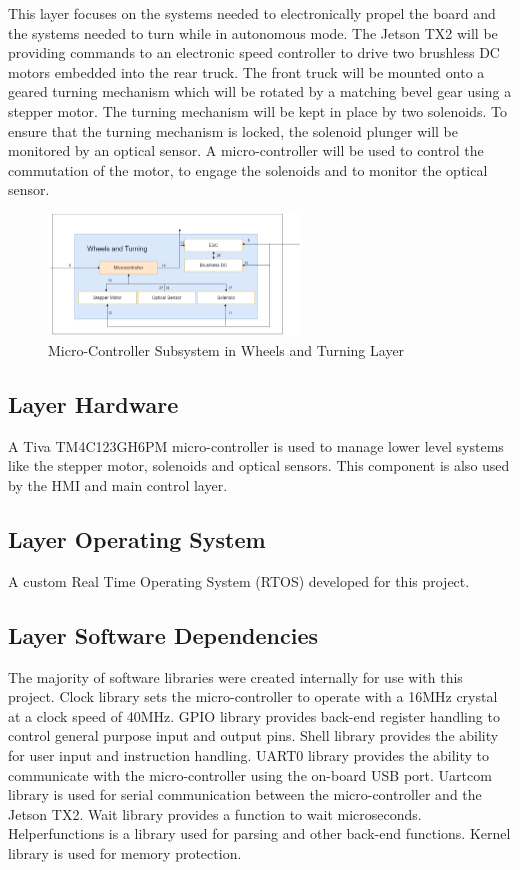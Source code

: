 This layer focuses on the systems needed to electronically propel the board and the systems needed to turn while in autonomous mode. The Jetson TX2 will be providing commands to an electronic speed controller to drive two brushless DC motors embedded into the rear truck. The front truck will be mounted onto a geared turning mechanism which will be rotated by a matching bevel gear using a stepper motor. The turning mechanism will be kept in place by two solenoids. To ensure that the turning mechanism is locked, the solenoid plunger will be monitored by an optical sensor. A micro-controller will be used to control the commutation of the motor, to engage the solenoids and to monitor the optical sensor.

\begin{figure}[h!]
	\centering
 	\includegraphics[width=0.60\textwidth]{images/Keaton/MicroC.png}
 \caption{Micro-Controller Subsystem in Wheels and Turning Layer}
\end{figure}

\subsection{Layer Hardware}
A Tiva TM4C123GH6PM micro-controller is used to manage lower level systems like the stepper motor, solenoids and optical sensors. This component is also used by the HMI and main control layer.

\subsection{Layer Operating System}
A custom Real Time Operating System (RTOS) developed for this project.

\subsection{Layer Software Dependencies}
The majority of software libraries were created internally for use with this project. Clock library sets the micro-controller to operate with a 16MHz crystal at a clock speed of 40MHz. GPIO library provides back-end register handling to control general purpose input and output pins. Shell library provides the ability for user input and instruction handling. UART0 library provides the ability to communicate with the micro-controller using the on-board USB port. Uartcom library is used for serial communication between the micro-controller and the Jetson TX2. Wait library provides a function to wait microseconds. Helperfunctions is a library used for parsing and other back-end functions. Kernel library is used for memory protection.

